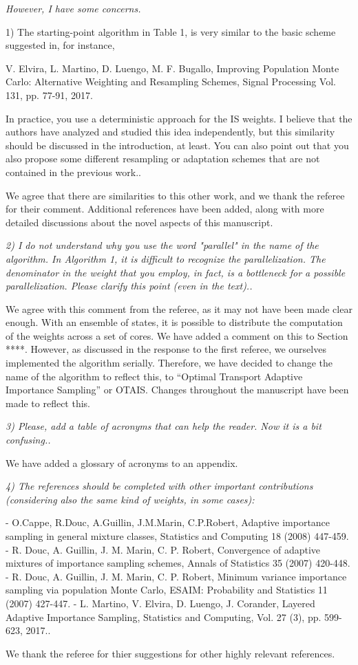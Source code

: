 \documentclass{article}
\newcommand{\comment}[2]{\vspace{0.6cm}{\bf Comment:} {\it #1.}

\vspace{0.3cm}{\bf Answer:} #2}
\begin{document}
\comment{However, I have some concerns. 

1) The starting-point algorithm in Table 1, is very similar to the basic scheme suggested in, for instance, 

V. Elvira, L. Martino, D. Luengo, M. F. Bugallo, Improving Population Monte Carlo: Alternative Weighting and Resampling Schemes, Signal Processing Vol. 131, pp. 77-91, 2017. 

In practice, you use a deterministic approach for the IS weights. 
I believe that the authors have analyzed and studied this idea independently, but this similarity should be discussed in the introduction, at least. 
You can also point out that you also propose some different resampling or adaptation schemes that are not contained in the previous work.}{We agree that there are similarities to this other work, and we thank the referee for their comment. Additional references have been added, along with more detailed discussions about the novel aspects of this manuscript.}

\comment{2) I do not understand why you use the word "parallel" in the name of the algorithm. In Algorithm 1, it is difficult to recognize the parallelization. The denominator in the weight that you employ, in fact, is a bottleneck for a possible parallelization. Please clarify this point (even in the text).}{We agree with this comment from the referee, as it may not have been made clear enough. With an ensemble of states, it is possible to distribute the computation of the weights across a set of cores. We have added a comment on this to Section ****. However, as discussed in the response to the first referee, we ourselves implemented the algorithm serially. Therefore, we have decided to change the name of the algorithm to reflect this, to ``Optimal Transport Adaptive Importance Sampling'' or OTAIS. Changes throughout the manuscript have been made to reflect this.}

\comment{3) Please, add a table of acronyms that can help the reader. Now it is a bit confusing.}{We have added a glossary of acronyms to an appendix.} 

\comment{4) The references should be completed with other important contributions (considering also the same kind of weights, in some cases): 

- O.Cappe, R.Douc, A.Guillin, J.M.Marin, C.P.Robert, Adaptive importance sampling in general mixture classes, Statistics and Computing 18 (2008) 447-459. 
- R. Douc, A. Guillin, J. M. Marin, C. P. Robert, Convergence of adaptive mixtures of importance sampling schemes, Annals of Statistics 35 (2007) 420-448. 
- R. Douc, A. Guillin, J. M. Marin, C. P. Robert, Minimum variance importance sampling via population Monte Carlo, ESAIM: Probability and Statistics 11 (2007) 427-447. 
- L. Martino, V. Elvira, D. Luengo, J. Corander, Layered Adaptive Importance Sampling, Statistics and Computing, Vol. 27 (3), pp. 599-623, 2017.}{We thank the referee for thier suggestions for other highly relevant references.}
\end{document}
